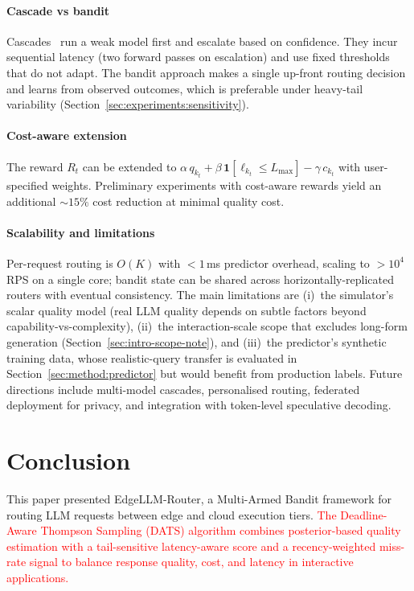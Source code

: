 \documentclass[final,3p,twocolumn,authoryear]{elsarticle}
\newcommand{\rev}[1]{\textcolor{red}{#1}}
\newcommand{\system}{EdgeLLM-Router\xspace}
\theoremstyle{plain}
\theoremstyle{definition}
\begin{document}
\paragraph{Cascade vs bandit}
Cascades~\citep{chen2023frugalgpt} run a weak model first and escalate based on confidence. They incur sequential latency (two forward passes on escalation) and use fixed thresholds that do not adapt. The bandit approach makes a single up-front routing decision and learns from observed outcomes, which is preferable under heavy-tail variability (Section~\ref{sec:experiments:sensitivity}).

\paragraph{Cost-aware extension}
The reward $R_t$ can be extended to $\alpha\,q_{k_t} + \beta\,\mathbf{1}[\ell_{k_t}\leq L_{\max}] - \gamma\,c_{k_t}$ with user-specified weights. Preliminary experiments with cost-aware rewards yield an additional $\sim 15\%$ cost reduction at minimal quality cost.

\paragraph{Scalability and limitations}
Per-request routing is $O(K)$ with $<1$\,ms predictor overhead, scaling to $>10^4$ RPS on a single core; bandit state can be shared across horizontally-replicated routers with eventual consistency. The main limitations are (i)~the simulator's scalar quality model (real LLM quality depends on subtle factors beyond capability-vs-complexity), (ii)~the interaction-scale scope that excludes long-form generation (Section~\ref{sec:intro-scope-note}), and (iii)~the predictor's synthetic training data, whose realistic-query transfer is evaluated in Section~\ref{sec:method:predictor} but would benefit from production labels. Future directions include multi-model cascades, personalised routing, federated deployment for privacy, and integration with token-level speculative decoding.

\section{Conclusion}
\label{sec:conclusion}

This paper presented \system{}, a Multi-Armed Bandit framework for routing LLM requests between edge and cloud execution tiers.
\rev{The Deadline-Aware Thompson Sampling (DATS) algorithm combines posterior-based quality estimation with a tail-sensitive latency-aware score and a recency-weighted miss-rate signal to balance response quality, cost, and latency in interactive applications.}
\end{document}
